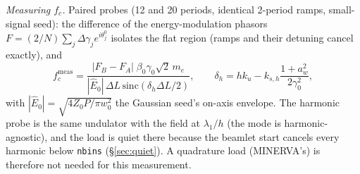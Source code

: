 \documentclass[11pt]{article}
\newcommand{\code}[1]{\texttt{#1}}
\begin{document}
\emph{Measuring $f_c$.} Paired probes (12 and 20 periods, identical 2-period ramps,
small-signal seed): the difference of the energy-modulation phasors
$F = (2/N)\sum_j \Delta\gamma_j e^{i\theta_j^0}$ isolates the flat region (ramps
and their detuning cancel exactly), and
\begin{equation}\label{eq:fcmeas}
  f_c^{\mathrm{meas}} =
  \frac{|F_B - F_A|\;\beta_0\gamma_0\sqrt2\, m_e}{|\hat E_0|\,\Delta L\,
        \mathrm{sinc}(\delta_h \Delta L/2)},\qquad
  \delta_h = h k_u - k_{s,h}\frac{1+a_w^2}{2\gamma_0^2},
\end{equation}
with $|\hat E_0| = \sqrt{4 Z_0 P/\pi w_0^2}$ the Gaussian seed's on-axis envelope.
The harmonic probe is the same undulator with the field at $\lambda_1/h$ (the mode
is harmonic-agnostic), and the load is quiet there because the beamlet start
cancels every harmonic below \code{nbins} (\S\ref{sec:quiet}). A quadrature load
(MINERVA's) is therefore not needed for this measurement.
\end{document}
